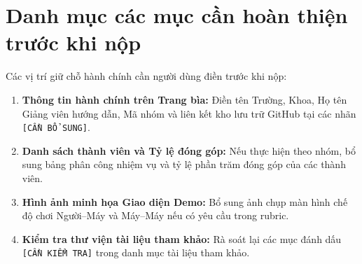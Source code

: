 \documentclass[11pt, a4paper]{article}
\begin{document}
\section{Danh mục các mục cần hoàn thiện trước khi nộp}
Các vị trí giữ chỗ hành chính cần người dùng điền trước khi nộp:
\begin{enumerate}
    \item \textbf{Thông tin hành chính trên Trang bìa:} Điền tên Trường, Khoa, Họ tên Giảng viên hướng dẫn, Mã nhóm và liên kết kho lưu trữ GitHub tại các nhãn \texttt{[CẦN BỔ SUNG]}.
    \item \textbf{Danh sách thành viên và Tỷ lệ đóng góp:} Nếu thực hiện theo nhóm, bổ sung bảng phân công nhiệm vụ và tỷ lệ phần trăm đóng góp của các thành viên.
    \item \textbf{Hình ảnh minh họa Giao diện Demo:} Bổ sung ảnh chụp màn hình chế độ chơi Người--Máy và Máy--Máy nếu có yêu cầu trong rubric.
    \item \textbf{Kiểm tra thư viện tài liệu tham khảo:} Rà soát lại các mục đánh dấu \texttt{[CẦN KIỂM TRA]} trong danh mục tài liệu tham khảo.
\end{enumerate}
\end{document}
